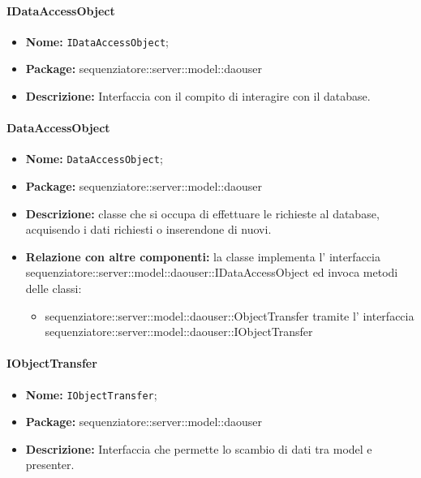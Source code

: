 \paragraph{IDataAccessObject}
	\begin{itemize}
		\item \textbf{Nome:} \texttt{IDataAccessObject};
		\item \textbf{Package:} sequenziatore::server::model::daouser
		\item \textbf{Descrizione:} Interfaccia con il compito di interagire con il database.
	\end{itemize}
\paragraph{DataAccessObject}
	\begin{itemize}
		\item \textbf{Nome:} \texttt{DataAccessObject};
		\item \textbf{Package:} sequenziatore::server::model::daouser
		\item \textbf{Descrizione:} classe che si occupa di effettuare le richieste al database, acquisendo i dati richiesti o inserendone di nuovi.
		\item \textbf{Relazione con altre componenti:} la classe implementa l' interfaccia sequenziatore::server::model::daouser::IDataAccessObject ed invoca metodi delle classi:
		\begin{itemize}
			\item sequenziatore::server::model::daouser::ObjectTransfer tramite l' interfaccia sequenziatore::server::model::daouser::IObjectTransfer
		\end{itemize}
	\end{itemize}
\paragraph{IObjectTransfer}
	\begin{itemize}
		\item \textbf{Nome:} \texttt{IObjectTransfer};
		\item \textbf{Package:} sequenziatore::server::model::daouser
		\item \textbf{Descrizione:} Interfaccia che permette lo scambio di dati tra model e presenter.
	\end{itemize}
